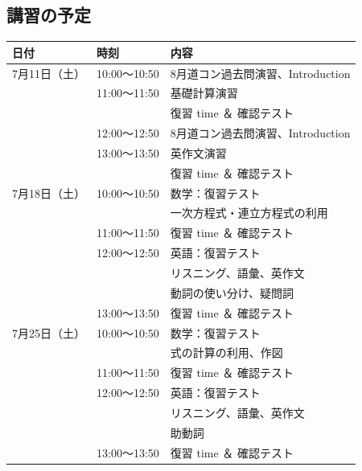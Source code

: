 \subsection{\textbf{講習の予定}}
    \begin{tabular}{l l p{6cm}}
      \toprule
      \textbf{日付} & \textbf{時刻} & \textbf{内容} \\
      \midrule
       {7月11日（土）} & 10:00～10:50 & 8月道コン過去問演習、Introduction\\
                      & 11:00～11:50 & 基礎計算演習\\
                      &              & 復習 time ＆ 確認テスト \\
                      & 12:00～12:50 & 8月道コン過去問演習、Introduction\\
                      & 13:00～13:50 & 英作文演習\\
                      &              & 復習 time ＆ 確認テスト \\
      \midrule
       {7月18日（土）} & 10:00～10:50 & 数学：復習テスト \\
                      &              & \qquad\;\; 一次方程式・連立方程式の利用\\
                      & 11:00～11:50 & \qquad\;\; 復習 time ＆ 確認テスト\\
                      & 12:00～12:50 & 英語：復習テスト \\
                      &              & \qquad\;\; リスニング、語彙、英作文\\
                      &              & \qquad\;\; 動詞の使い分け、疑問詞 \\
                      & 13:00～13:50 & \qquad\;\; 復習 time ＆ 確認テスト\\
      \midrule
       {7月25日（土）} & 10:00～10:50 & 数学：復習テスト \\
                      &              & \qquad\;\; 式の計算の利用、作図\\
                      & 11:00～11:50 & \qquad\;\; 復習 time ＆ 確認テスト\\
                      & 12:00～12:50 & 英語：復習テスト \\
                      &              & \qquad\;\; リスニング、語彙、英作文\\
                      &              & \qquad\;\; 助動詞\\
                      & 13:00～13:50 & \qquad\;\; 復習 time ＆ 確認テスト\\

\end{tabular}
